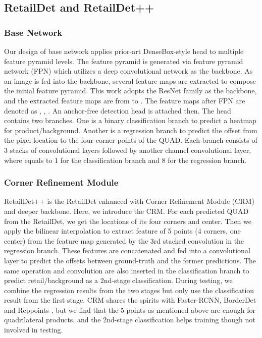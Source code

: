 \documentclass[runningheads]{llncs}
\begin{document}
\subsection{RetailDet and RetailDet++}
\subsubsection{Base Network}
Our design of base network applies prior-art DenseBox-style head \cite{densebox} to multiple feature pyramid levels. The feature pyramid is generated via feature pyramid network (FPN) \cite{lin2016feature} which utilizes a deep convolutional network as the backbone. As an image is fed into the backbone, several feature maps are extracted to compose the initial feature pyramid. This work adopts the ResNet family as the backbone, and the extracted feature maps are from  to . The feature maps after FPN are denoted as , , . An anchor-free detection head is attached then. The head contains two branches. One is a binary classification branch to predict a heatmap for product/background. Another is a regression branch to predict the offset from the pixel location to the four corner points of the QUAD. Each branch consists of 3 stacks of convolutional layers followed by another  channel convolutional layer, where  equals to 1 for the classification branch and 8 for the regression branch.

\subsubsection{Corner Refinement Module}
RetailDet++ is the RetailDet enhanced with Corner Refinement Module (CRM) and deeper backbone. Here, we introduce the CRM. For each predicted QUAD from the RetailDet, we get the locations of its four corners and center. Then we apply the bilinear interpolation to extract feature of 5 points (4 corners, one center) from the feature map generated by the 3rd stacked convolution in the regression branch. These features are concatenated and fed into a  convolutional layer to predict the offsets between ground-truth and the former predictions. The same operation and convolution are also inserted in the classification branch to predict retail/background as a 2nd-stage classification. During testing, we combine the regression results from the two stages but only use the classification result from the first stage. CRM shares the spirits with Faster-RCNN\cite{ren2015faster}, BorderDet\cite{BorderDet} and Reppoints \cite{reppoints}, but we find that the 5 points as mentioned above are enough for quadrilateral products, and the 2nd-stage classification helps training though not involved in testing.
\end{document}
